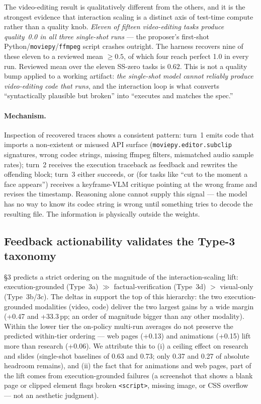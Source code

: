 The video-editing result is qualitatively different from the others, and it is the strongest evidence that interaction scaling is a distinct axis of test-time compute rather than a quality knob. \emph{Eleven of fifteen video-editing tasks produce quality~0.0 in all three single-shot runs} --- the proposer's first-shot Python/\texttt{moviepy}/\texttt{ffmpeg} script crashes outright. The harness recovers nine of these eleven to a reviewed mean $\geq 0.5$, of which four reach perfect 1.0 in every run. Reviewed mean over the eleven SS-zero tasks is $0.62$. This is not a quality bump applied to a working artifact: \emph{the single-shot model cannot reliably produce video-editing code that runs}, and the interaction loop is what converts ``syntactically plausible but broken'' into ``executes and matches the spec.''

\paragraph{Mechanism.} Inspection of recovered traces shows a consistent pattern: turn~1 emits code that imports a non-existent or misused API surface (\texttt{moviepy.editor.subclip} signatures, wrong codec strings, missing ffmpeg filters, mismatched audio sample rates); turn~2 receives the execution traceback as feedback and rewrites the offending block; turn~3 either succeeds, or (for tasks like ``cut to the moment a face appears'') receives a keyframe-VLM critique pointing at the wrong frame and revises the timestamp. Reasoning alone cannot supply this signal --- the model has no way to know its codec string is wrong until something tries to decode the resulting file. The information is physically outside the weights.

\subsection{Feedback actionability validates the Type-3 taxonomy}
\label{sec:harness-taxonomy}

\S{}3 predicts a strict ordering on the magnitude of the interaction-scaling lift: execution-grounded (Type~3a) $\gg$ factual-verification (Type~3d) $>$ visual-only (Type~3b/3c). The deltas in  support the top of this hierarchy: the two execution-grounded modalities (video, code) deliver the two largest gains by a wide margin (+0.47 and +33.3\,pp; an order of magnitude bigger than any other modality). Within the lower tier the on-policy multi-run averages do not preserve the predicted within-tier ordering --- web pages (+0.13) and animations (+0.15) lift more than research (+0.06). We attribute this to (i) a ceiling effect on research and slides (single-shot baselines of 0.63 and 0.73; only 0.37 and 0.27 of absolute headroom remains), and (ii) the fact that for animations and web pages, part of the lift comes from execution-grounded failures (a screenshot that shows a blank page or clipped element flags broken \texttt{<script>}, missing image, or CSS overflow --- not an aesthetic judgment).


